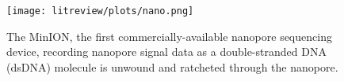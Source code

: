 \begin{figure}
\centering
\texttt{[image: litreview/plots/nano.png]}
\caption[\label{fig:nano}The MinION, the first commercially-available nanopore sequencing device, recording nanopore signal data as a double-stranded DNA (dsDNA) molecule is unwound and ratcheted through the nanopore.]{\label{fig:nano}The MinION, the first commercially-available nanopore sequencing device, recording nanopore signal data as a double-stranded DNA (dsDNA) molecule is unwound and ratcheted through the nanopore\protect\footnotemark[3].}
\end{figure}
